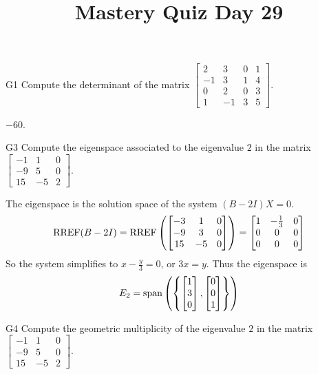 \documentclass{sbgLAquiz}
\title{Mastery Quiz Day 29 }
\begin{document}
\begin{problem}{G1}
Compute the determinant of the matrix $\begin{bmatrix} 2 & 3 & 0 & 1 \\ -1 & 3 & 1 & 4 \\ 0 & 2 & 0 & 3 \\ 1 & -1 & 3 & 5 \end{bmatrix}$.
\end{problem}
\begin{solution}
$-60$.
\end{solution}

\begin{problem}{G3}
Compute the eigenspace associated to the eigenvalue $2$ in the matrix $\begin{bmatrix} -1 & 1 & 0 \\ -9 & 5 & 0 \\ 15 & -5 & 2 \end{bmatrix}$.
\end{problem}

\begin{solution}
The eigenspace is the solution space of the system $(B-2I)X=0$.
$$\operatorname{RREF}(B-2I)=\operatorname{RREF}\left(\begin{bmatrix} -3 & 1 & 0 \\ -9 & 3 & 0 \\ 15 & - 5 & 0 \end{bmatrix} \right) = \begin{bmatrix} 1 & -\frac{1}{3} & 0 \\ 0 & 0 & 0 \\ 0 & 0 & 0 \end{bmatrix}$$
So the system simplifies to $x-\frac{y}{3}=0$, or $3x=y$.  Thus the eigenspace is $$E_2 = {\rm span}\left( \left\{ \begin{bmatrix} 1 \\ 3 \\ 0 \end{bmatrix}, \begin{bmatrix} 0 \\ 0 \\ 1\end{bmatrix} \right\} \right)$$
\end{solution}
\begin{extract}\newpage\end{extract}
\begin{problem}{G4}
Compute the geometric multiplicity of the eigenvalue $2$ in the matrix $\begin{bmatrix} -1 & 1 & 0 \\ -9 & 5 & 0 \\ 15 & -5 & 2 \end{bmatrix}$.
\end{problem}
\end{document}
